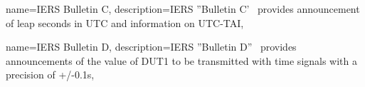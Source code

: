  {
	name={IERS Bulletin C},
	description={\gls{IERS} ''Bulletin C'~\cite{iersBULLETINCProductMetadata} provides announcement of leap seconds in UTC and information on UTC-TAI},
}

 {
	name={IERS Bulletin D},
	description={\gls{IERS} ''Bulletin D''~\cite{iersBULLETINDProductMetadata} provides announcements of the value of DUT1 to be transmitted with time signals with a precision of +/-0.1s},
}
